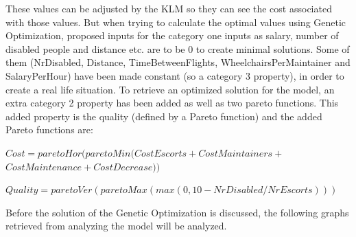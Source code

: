 \documentclass[a4paper, 11pt, notitlepage]{report}
\begin{document}
These values can be adjusted by the KLM so they can see the cost associated with those values. But when trying to calculate the optimal values using Genetic Optimization, proposed inputs for the category one inputs as salary, number of disabled people and distance etc. are to be 0 to create minimal solutions. Some of them (NrDisabled, Distance, TimeBetweenFlights, WheelchairsPerMaintainer and SalaryPerHour) have been made constant (so a category 3 property), in order to create a real life situation. To retrieve an optimized solution for the model, an extra category 2 property has been added as well as two pareto functions. This added property is the quality (defined by a Pareto function) and the added Pareto functions are:

\begin{center}
\vspace{-4pt}$Cost=paretoHor(paretoMin(CostEscorts+CostMaintainers+$\\$CostMaintenance+CostDecrease))$
\end{center}
\begin{center}
\vspace{-8pt}$Quality=paretoVer(paretoMax(max(0,10-NrDisabled/NrEscorts)))$
\end{center}
\vspace{-4pt}Before the solution of the Genetic Optimization is discussed, the following graphs retrieved from analyzing the model will be analyzed.
\end{document}
